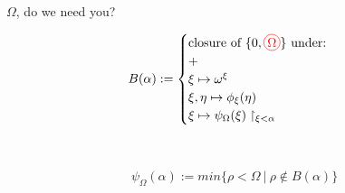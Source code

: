 \documentclass{beamer}
\newcommand*\circled[1]{\tikz[baseline=(char.base)]{
   \node[shape=circle,color=red,draw,inner sep=1pt] (char) {#1};}}
\begin{document}
\begin{frame}{$\Omega$, do we need you?}
\centering
\begin{minipage}{0.45\textwidth}
\begin{align*}
		B(\alpha) := 
		\begin{cases}
			\text{closure of } \{0,\circled{$\Omega$}\} \text{ under:} \\
			+ \\
			 \xi \mapsto \omega^\xi \\ 
			 \xi, \eta \mapsto \phi_{\xi}(\eta) \\ 
			\xi \mapsto \psi_{\Omega}(\xi) \upharpoonright_{\xi < \alpha} 
		\end{cases}\\
	\end{align*}
    \end{minipage}\hfill \\
    
    
    \begin{minipage}{0.45\textwidth}
	\begin{align*}
		\psi_{\Omega}(\alpha) := min\{ \rho < \Omega \  | \  \rho \notin B(\alpha) \} 
	\end{align*}
    \end{minipage}

\end{frame}
\end{document}
